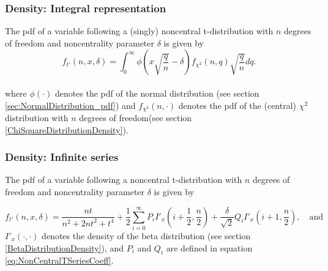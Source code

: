 \subsubsection{Density: Integral representation}
The pdf of a variable following a (singly) noncentral  t-distribution with $n$ degrees of freedom and noncentrality parameter $\delta$ is given by \citep{Witkovsky_2013}
\begin{equation}
f_{t'}\left(n,x, \delta\right) = \int_{0}^{\infty} \phi \left(x \sqrt{\frac{q}{n}} -\delta\right) f_{\chi^2}(n, q) \sqrt{\frac{q}{n}} dq.
\end{equation} \\
where $\phi(\cdot)$ denotes the pdf of the normal distribution (see section \ref{sec:NormalDistribution_pdf}) and $f_{\chi^2}(n, \cdot)$ denotes the pdf of the (central) $\chi^2$ distribution with $n$ degrees of freedom(see section \ref{ChiSquareDistributionDensity}).




\subsubsection{Density: Infinite series}
The pdf of a variable following a noncentral  t-distribution with $n$ degrees of freedom and noncentrality parameter $\delta$ is given by \citep{boost_math}

\begin{equation}
f_{t'}\left(n,x, \delta\right) = \frac{nt}{n^2+2nt^2+t^4} + \frac{1}{2} \sum_{i=0}^{\infty} P_i I'_x\left(i+ \frac{1}{2} , \frac{n}{2}\right) + \frac{\delta}{\sqrt{2}} Q_i I'_x\left(i+1, \frac{n}{2}\right), \quad \text{and}
\end{equation} 
$I'_x(\cdot,\cdot)$ denotes the density of the beta distribution (see section \ref{BetaDistributionDensity}), and $P_i$ and $Q_i$ are defined in equation \ref{eq:NonCentralTSeriesCoeff}.




\label{NoncentraltDistributionCDFBoost}



